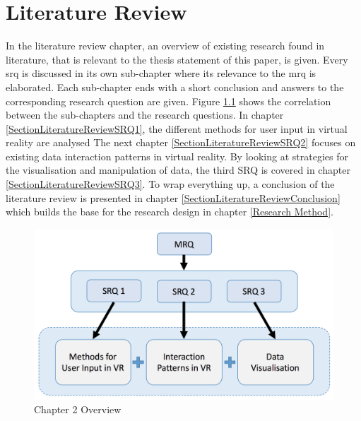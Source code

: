 
\chapter{Literature Review} %

\label{ChapterLiteratureReview} %

In the literature review chapter, an overview of existing research found in literature, that is relevant to the thesis statement of this paper, is given. Every \gls{srq} is discussed in its own sub-chapter where its relevance to the \gls{mrq} is elaborated. Each sub-chapter ends with a short conclusion and answers to the corresponding research question are given.
Figure \ref{fig:litreviewoverview} shows the correlation between the sub-chapters and the research questions. In chapter \ref{SectionLiteratureReviewSRQ1}, the different methods for user input in virtual reality are analysed The next chapter \ref{SectionLiteratureReviewSRQ2} focuses on existing data interaction patterns in virtual reality. By looking at strategies for the visualisation and manipulation of data, the third SRQ is covered in chapter \ref{SectionLiteratureReviewSRQ3}. To wrap everything up, a conclusion of the literature review is presented in chapter \ref{SectionLiteratureReviewConclusion} which builds the base for the research design in chapter \ref{Research Method}.
\newline
\begin{figure}[h]
	\begin{center}
		\includegraphics[width=12cm]{03_Figures/05_LitReview/LitReview_SRQ.png}
		\caption{Chapter 2 Overview}
		\label{fig:litreviewoverview}
	\end{center}
\end{figure}

